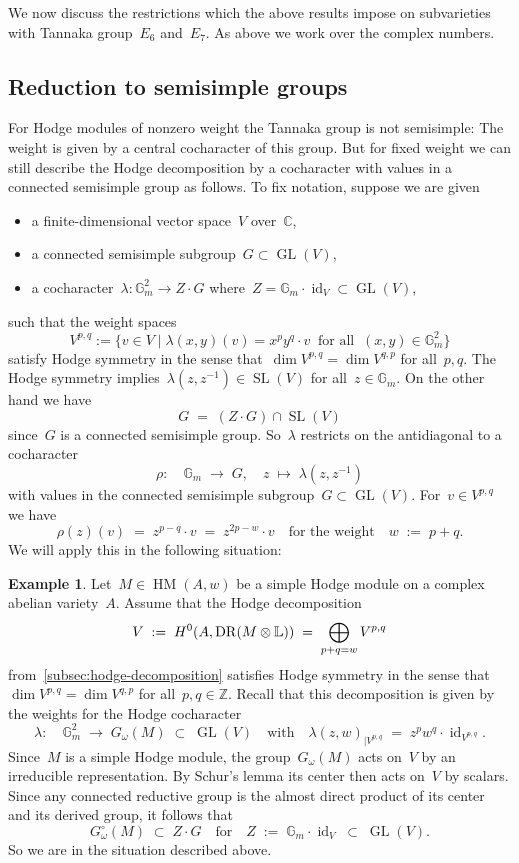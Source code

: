 \documentclass[a4paper]{amsart}
\newcommand{\bbC}{\mathbb{C}}
\newcommand{\bbG}{\mathbb{G}}
\newcommand{\bbL}{\mathbb{L}}
\newcommand{\bbZ}{\mathbb{Z}}
\newcommand{\rH}{\textup{H}}
\DeclareMathOperator{\GL}{GL}
\DeclareMathOperator{\SL}{SL}
\DeclareMathOperator{\id}{id}
\DeclareMathOperator{\DR}{DR}
\DeclareMathOperator{\HM}{HM}
\theoremstyle{plain}
\theoremstyle{definition}
\newtheorem{example}[theorem]{Example}
\numberwithin{equation}{section}
\begin{document}
We now discuss the restrictions which the above results impose on subvarieties with Tannaka group~$E_6$ and~$E_7$. As above we work over the complex numbers.

\subsection{Reduction to semisimple groups} For Hodge modules of nonzero weight the Tannaka group is not semisimple: The weight is given by a central cocharacter of this group. But for fixed weight we can still describe the Hodge decomposition by a cocharacter with values in a connected semisimple group as follows. To fix notation, suppose we are given\smallskip
%
\begin{itemize} 
\item a finite-dimensional vector space~$V$ over~$\bbC$,\smallskip
\item a connected semisimple subgroup~$G\subset \GL(V)$,\smallskip
\item a cocharacter~$\lambda\colon \bbG_m^2 \to Z\cdot G$ where~$Z=\bbG_m\cdot \id_V \subset \GL(V)$,\smallskip 
\end{itemize} 
%
such that the weight spaces 
%
\[ V^{p,q} := \{ v\in V \mid \lambda(x,y)(v)=x^py^q \cdot v \;\; \text{for all} \;\; (x,y) \in \bbG_m^2 \} 
\] 
%
satisfy Hodge symmetry in the sense that~$\dim V^{p,q} = \dim V^{q,p}$ for all~$p,q$. The Hodge symmetry implies~$\lambda(z,z^{-1}) \in \SL(V)$ for all~$z\in \bbG_m$. On the other hand we have 
%
\[ G \;=\; (Z\cdot G) \cap \SL(V) \]
%
since~$G$ is a connected semisimple group. So~$\lambda$ restricts on the antidiagonal to a cocharacter 
%
\[
 \rho\colon \quad \bbG_m \;\longrightarrow\; G, \quad z \;\longmapsto\; \lambda(z, z^{-1})
\]
%
with values in the connected semisimple subgroup~$G\subset \GL(V)$. For~$v\in V^{p,q}$ we have
%
\[
 \rho(z)(v) \;=\; z^{p-q} \cdot v
 \;=\; z^{2p-w} \cdot v
 \quad \text{for the weight} \quad 
 w \;:=\; p+q.
\]
%
We will apply this in the following situation:

\begin{example} 
Let~$M\in \HM(A,w)$ be a simple Hodge module on a complex abelian variety~$A$. Assume that the Hodge decomposition
%
\[
 V \;:=\; \rH^0(A, \DR(M\otimes \bbL)) \;=\; \bigoplus_{p+q=w} V^{p,q}
\]
%
from~\cref{subsec:hodge-decomposition} satisfies Hodge symmetry in the sense that~$\dim V^{p,q} = \dim V^{q,p}$ 
%
for all~$p,q\in \bbZ$. Recall that this decomposition is given by the weights for the Hodge cocharacter
%
\[
 \lambda \colon \quad \bbG_m^2 \;\longrightarrow\; G_\omega(M) \;\subset\; \GL(V)
 \quad 
 \text{with} 
 \quad 
 \lambda(z,w)_{\vert V^{p,q}} \;=\; z^p w^q \cdot \id_{V^{p,q}}.
\]
%
Since~$M$ is a simple Hodge module, the group~$G_\omega(M)$ acts on~$V$ by an irreducible representation. By Schur's lemma its center then acts on~$V$ by scalars. Since any connected reductive group is the almost direct product of its center and its derived group, it follows that
%
\[
 G_\omega^\circ(M) \;\subset\; Z \cdot G
 \quad \text{for} \quad Z \;:=\; \bbG_m \cdot \id_V\;\subset\; \GL(V).
\]
%
So we are in the situation described above. 
\end{example} 
\end{document}

